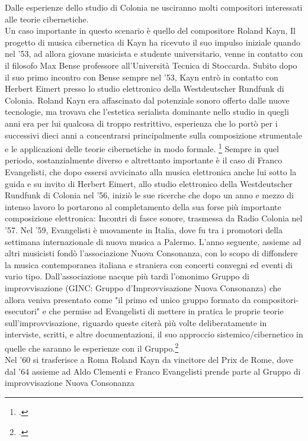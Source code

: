 Dalle esperienze dello studio di Colonia ne usciranno molti compositori interessati
alle teorie cibernetiche. \\
Un caso importante in questo scenario è quello del compositore Roland Kayn,
Il progetto di musica cibernetica di Kayn ha ricevuto il suo impulso iniziale
quando nel '53, ad allora giovane musicista e studente universitario,
venne in contatto con il filosofo Max Bense professore all'Università Tecnica di Stoccarda.
Subito dopo il suo primo incontro con Bense sempre nel '53, Kayn entrò in contatto con Herbert
Eimert presso lo studio elettronico della Westdeutscher Rundfunk di Colonia.
Roland Kayn era affascinato dal potenziale sonoro offerto dalle nuove tecnologie,
ma trovava che l'estetica serialista dominante nello studio in quegli anni
era per lui qualcosa di troppo restrittivo, esperienza che lo portò
per i successivi dieci anni a concentrarsi
principalmente sulla composizione strumentale e le applicazioni delle teorie
cibernetiche in modo formale. \footcite{thomaswpattesonkayn}
Sempre in quel periodo, sostanzialmente diverso e altrettanto importante
è il caso di Franco Evangelisti, che dopo essersi avvicinato alla musica elettronica
anche lui sotto la guida e su invito di Herbert Eimert, allo studio elettronico
della Westdeutscher Rundfunk di Colonia nel '56,
iniziò le sue ricerche che dopo un anno e mezzo di intenso lavoro lo portarono
al completamento della sua forse più importante composizione elettronica:
Incontri di fasce sonore, trasmessa da Radio Colonia nel '57.
Nel '59, Evangelisti è nuovamente in Italia, dove fu tra i promotori
della settimana internazionale di nuova musica a Palermo.
L'anno seguente, assieme ad altri musicisti
fondò l'associazione Nuova Consonanza, con lo scopo di diffondere
la musica contemporanea italiana e straniera con concerti convegni ed eventi di vario tipo.
Dall'associazione nacque più tardi l'omonimo Gruppo di improvvisazione 
(GINC: Gruppo d'Improvvisazione Nuova Consonanza)
che allora veniva presentato come "il primo ed unico gruppo formato da compositori-esecutori"
e che permise ad Evangelisti di mettere in pratica le proprie teorie sull'improvvisazione,
riguardo queste citerà più volte deliberatamente in interviste, scritti,
e altre documentazioni, il suo approccio sistemico/cibernetico
in quelle che saranno le esperienze con il Gruppo.\footcite{GINCAzioni} \\
Nel '60 si trasferisce a Roma Roland Kayn da vincitore del Prix de Rome,
dove dal '64 assieme ad Aldo Clementi e Franco Evangelisti
prende parte al Gruppo di improvvisazione Nuova Consonanza
